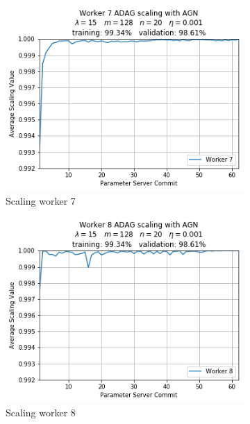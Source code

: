 \begin{figure}
\begin{subfigure}{.24\textwidth}
    \includegraphics[width=\linewidth]{resources/images/plots/adag_agn_mnist/epoch_40/15/001/scaling/worker_7}
    \caption{Scaling worker 7}
  \end{subfigure}
  \begin{subfigure}{.24\textwidth}
    \centering
    \includegraphics[width=\linewidth]{resources/images/plots/adag_agn_mnist/epoch_40/15/001/scaling/worker_8}
    \caption{Scaling worker 8}
  \end{subfigure}
  \begin{subfigure}{.24\textwidth}
    \centering

\end{subfigure}
\end{figure}

